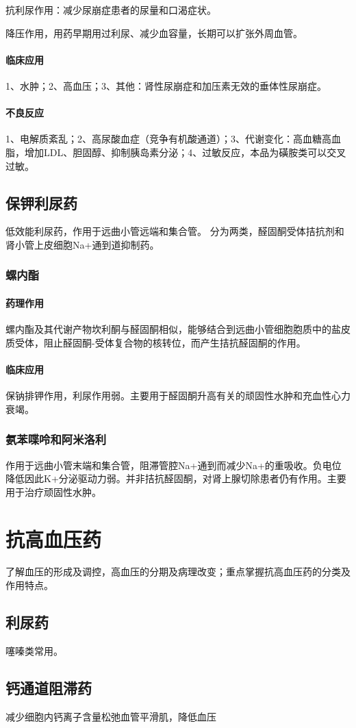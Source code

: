 \documentclass[UTF8]{ctexbook}
\begin{document}
抗利尿作用：减少尿崩症患者的尿量和口渴症状。

降压作用，用药早期用过利尿、减少血容量，长期可以扩张外周血管。
\subsubsection{临床应用}
1、水肿；2、高血压；3、其他：肾性尿崩症和加压素无效的垂体性尿崩症。
\subsubsection{不良反应}
1、电解质紊乱；2、高尿酸血症（竞争有机酸通道）；3、代谢变化：高血糖高血脂，增加LDL、胆固醇、抑制胰岛素分泌；4、过敏反应，本品为磺胺类可以交叉过敏。
\section{保钾利尿药}低效能利尿药，作用于远曲小管远端和集合管。
分为两类，醛固酮受体拮抗剂和肾小管上皮细胞Na+通到道抑制药。
\subsection{螺内酯}
\subsubsection{药理作用}
螺内酯及其代谢产物坎利酮与醛固酮相似，能够结合到远曲小管细胞胞质中的盐皮质受体，阻止醛固酮-受体复合物的核转位，而产生拮抗醛固酮的作用。
\subsubsection{临床应用}
保钠排钾作用，利尿作用弱。主要用于醛固酮升高有关的顽固性水肿和充血性心力衰竭。
\subsection{氨苯喋呤和阿米洛利}
作用于远曲小管末端和集合管，阻滞管腔Na+通到而减少Na+的重吸收。负电位降低因此K+分泌驱动力弱。并非拮抗醛固酮，对肾上腺切除患者仍有作用。主要用于治疗顽固性水肿。
\chapter{抗高血压药}
了解血压的形成及调控，高血压的分期及病理改变；重点掌握抗高血压药的分类及作用特点。
\section{利尿药}噻嗪类常用。
\section{钙通道阻滞药}
减少细胞内钙离子含量松弛血管平滑肌，降低血压
\end{document}
